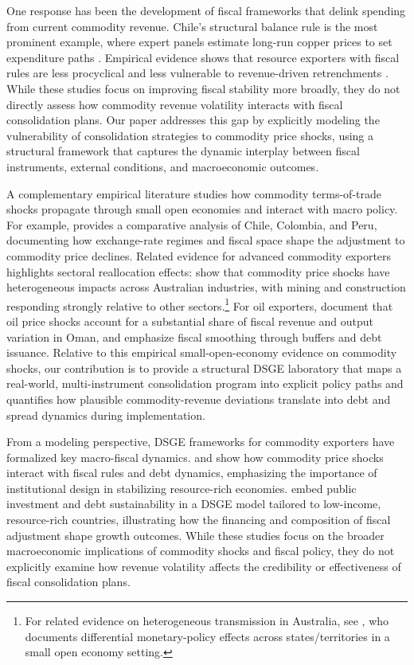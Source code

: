 \documentclass[12pt]{article}
\begin{document}
One response has been the development of fiscal frameworks that delink spending from current commodity revenue. Chile’s structural balance rule is the most prominent example, where expert panels estimate long-run copper prices to set expenditure paths \citep[see][]{Frankel2011}. Empirical evidence shows that resource exporters with fiscal rules are less procyclical and less vulnerable to revenue-driven retrenchments \citep[see][]{Bova2014,Eyraud2018}. While these studies focus on improving fiscal stability more broadly, they do not directly assess how commodity revenue volatility interacts with fiscal consolidation plans. Our paper addresses this gap by explicitly modeling the vulnerability of consolidation strategies to commodity price shocks, using a structural framework that captures the dynamic interplay between fiscal instruments, external conditions, and macroeconomic outcomes.

A complementary empirical literature studies how commodity terms-of-trade shocks propagate through small open economies and interact with macro policy. For example, \citet{Roch17} provides a comparative analysis of Chile, Colombia, and Peru, documenting how exchange-rate regimes and fiscal space shape the adjustment to commodity price declines. Related evidence for advanced commodity exporters highlights sectoral reallocation effects: \citet{KnopVespignani14} show that commodity price shocks have heterogeneous impacts across Australian industries, with mining and construction responding strongly relative to other sectors.\footnote{For related evidence on heterogeneous transmission in Australia, see \citet{Vespignani15}, who documents differential monetary-policy effects across states/territories in a small open economy setting.} For oil exporters, \citet{AlJabrietal22} document that oil price shocks account for a substantial share of fiscal revenue and output variation in Oman, and emphasize fiscal smoothing through buffers and debt issuance. Relative to this empirical small-open-economy evidence on commodity shocks, our contribution is to provide a structural DSGE laboratory that maps a real-world, multi-instrument consolidation program into explicit policy paths and quantifies how plausible commodity-revenue deviations translate into debt and spread dynamics during implementation.

From a modeling perspective, DSGE frameworks for commodity exporters have formalized key macro-fiscal dynamics. \citet{MedinaSoto2016} and \citet{MelinaYangZanna2016} show how commodity price shocks interact with fiscal rules and debt dynamics, emphasizing the importance of institutional design in stabilizing resource-rich economies. \citet{Buffie2012} embed public investment and debt sustainability in a DSGE model tailored to low-income, resource-rich countries, illustrating how the financing and composition of fiscal adjustment shape growth outcomes. While these studies focus on the broader macroeconomic implications of commodity shocks and fiscal policy, they do not explicitly examine how revenue volatility affects the credibility or effectiveness of fiscal consolidation plans.
\end{document}
